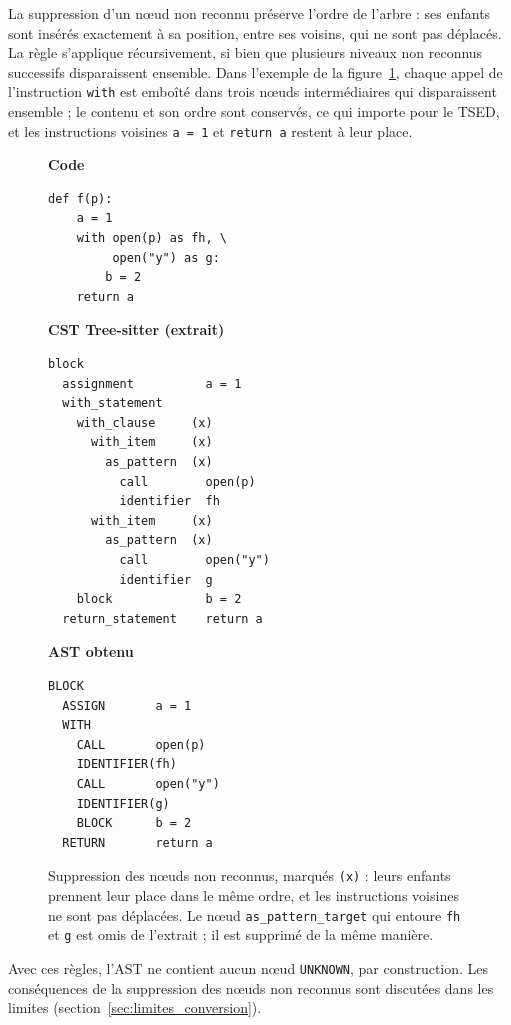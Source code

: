 \documentclass[12pt,a4paper,oneside]{report}
\begin{document}
La suppression d'un nœud non reconnu préserve l'ordre de l'arbre : ses
enfants sont insérés exactement à sa position, entre ses voisins, qui ne
sont pas déplacés. La règle s'applique récursivement, si bien que plusieurs
niveaux non reconnus successifs disparaissent ensemble. Dans l'exemple de la
figure~\ref{fig:unknown_splice}, chaque appel de l'instruction
\texttt{with} est emboîté dans trois nœuds intermédiaires qui disparaissent
ensemble ; le contenu et son ordre sont conservés, ce qui importe pour le
TSED, et les instructions voisines \texttt{a = 1} et \texttt{return a}
restent à leur place.

\begin{figure}[htbp]
\centering
\small
\begin{minipage}[t]{0.30\textwidth}
\textbf{Code}
\begin{verbatim}
def f(p):
    a = 1
    with open(p) as fh, \
         open("y") as g:
        b = 2
    return a
\end{verbatim}
\end{minipage}\hfill
\begin{minipage}[t]{0.36\textwidth}
\textbf{CST Tree-sitter (extrait)}
\begin{verbatim}
block
  assignment          a = 1
  with_statement
    with_clause     (x)
      with_item     (x)
        as_pattern  (x)
          call        open(p)
          identifier  fh
      with_item     (x)
        as_pattern  (x)
          call        open("y")
          identifier  g
    block             b = 2
  return_statement    return a
\end{verbatim}
\end{minipage}\hfill
\begin{minipage}[t]{0.30\textwidth}
\textbf{AST obtenu}
\begin{verbatim}
BLOCK
  ASSIGN       a = 1
  WITH
    CALL       open(p)
    IDENTIFIER(fh)
    CALL       open("y")
    IDENTIFIER(g)
    BLOCK      b = 2
  RETURN       return a
\end{verbatim}
\end{minipage}
\caption{Suppression des nœuds non reconnus, marqués \texttt{(x)} : leurs
enfants prennent leur place dans le même ordre, et les instructions voisines
ne sont pas déplacées. Le nœud \texttt{as\_pattern\_target} qui entoure
\texttt{fh} et \texttt{g} est omis de l'extrait ; il est supprimé de la même
manière.}
\label{fig:unknown_splice}
\end{figure}

Avec ces règles, l'AST ne contient aucun nœud \texttt{UNKNOWN}, par
construction. Les conséquences de la suppression des nœuds non reconnus sont
discutées dans les limites (section~\ref{sec:limites_conversion}).
\end{document}
